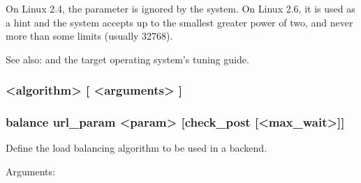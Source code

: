   On Linux 2.4, the parameter is ignored by the system. On Linux 2.6, it is
  used as a hint and the system accepts up to the smallest greater power of
  two, and never more than some limits (usually 32768).


See also:  and the target operating system's tuning guide.

\subsubsection[balance] { <algorithm> [ <arguments> ]}
\subsubsection*{balance url\_param <param> [check\_post [<max\_wait>]]}

  Define the load balancing algorithm to be used in a backend.

  
  Arguments:
